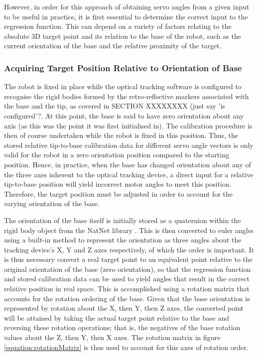 \documentclass[11pt]{article}
\begin{document}
However, in order for this approach of obtaining servo angles from a given input to be useful in practice, it is first essential to determine the correct input to the regression function. This can depend on a variety of factors relating to the absolute 3D target point and its relation to the base of the robot, such as the current orientation of the base and the relative proximity of the target.

\subsubsection{Acquiring Target Position Relative to Orientation of Base}
The robot is fixed in place while the optical tracking software is configured to recognise the rigid bodies formed by the retro-reflective markers associated with the base and the tip, as covered in SECTION XXXXXXXX (just say 'is configured'?. At this point, the base is said to have zero orientation about any axis (as this was the point it was first initialised in). The calibration procedure is then of course undertaken while the robot is fixed in this position. Thus, the stored relative tip-to-base calibration data for different servo angle vectors is only valid for the robot in a zero orientation position compared to the starting position. Hence, in practice, when the base has changed orientation about any of the three axes inherent to the optical tracking device, a direct input for a relative tip-to-base position will yield incorrect motor angles to meet this position. Therefore, the target position must be adjusted in order to account for the varying orientation of the base.

The orientation of the base itself is initially stored as a quaternion within the rigid body object from the NatNet library \cite{natnet2016}. This is then converted to euler angles using a built-in method to represent the orientation as three angles about the tracking device's X, Y and Z axes respectively, of which the order is important. It is thus necessary convert a real target point to an equivalent point relative to the original orientation of the base (zero orientation), so that the regression function and stored calibration data can be used to yield angles that result in the correct relative position in real space. This is accomplished using a rotation matrix that accounts for the rotation ordering of the base. Given that the base orientation is represented by rotation about the X, then Y, then Z axes, the converted point will be attained by taking the actual target point relative to the base and reversing these rotation operations; that is, the negatives of the base rotation values about the Z, then Y, then X axes. The rotation matrix in figure \ref{equation:rotationMatrix} is thus used to account for this axes of rotation order. 
\end{document}
